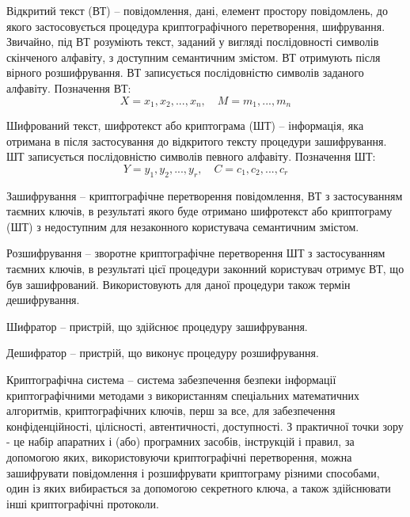 \begin{definition}
    Відкритий текст (ВТ) – повідомлення, дані, елемент простору
    повідомлень, до якого застосовується процедура криптографічного
    перетворення, шифрування. Звичайно, під ВТ розуміють текст, заданий у
    вигляді послідовності символів скінченого алфавіту, з доступним
    семантичним змістом. ВТ отримують після вірного розшифрування. ВТ
    записується послідовністю символів заданого алфавіту. Позначення ВТ:
    $$X = x_1, x_2, ..., x_n, \quad M = m_1, ..., m_n$$
\end{definition}

\begin{definition}
    Шифрований текст, шифротекст або криптограма (ШТ) –
    інформація, яка отримана в після застосування до відкритого тексту
    процедури зашифрування. ШТ записується послідовністю символів певного
    алфавіту. Позначення ШТ:
    $$Y = y_1, y_2, ..., y_r, \quad C = c_1, c_2, ..., c_r$$
\end{definition}

\begin{definition}[Зашифрування]
    Зашифрування – криптографічне перетворення повідомлення, ВТ з
    застосуванням таємних ключів, в результаті якого буде отримано
    шифротекст або криптограму (ШТ) з недоступним для незаконного
    користувача семантичним змістом.
\end{definition}

\begin{definition}[Розшифрування]
    Розшифрування – зворотне криптографічне перетворення ШТ з
    застосуванням таємних ключів, в результаті цієї процедури законний
    користувач отримує ВТ, що був зашифрований. Використовують для даної
    процедури також термін дешифрування.
\end{definition}

\begin{definition}[Шифратор]
    Шифратор – пристрій, що здійснює процедуру зашифрування.
\end{definition}

\begin{definition}[Дешифратор]
    Дешифратор – пристрій, що виконує процедуру розшифрування.
\end{definition}

\begin{definition}
    Криптографічна система – система забезпечення безпеки інформації
    криптографічними методами з використанням спеціальних математичних
    алгоритмів, криптографічних ключів, перш за все, для забезпечення
    конфіденційності, цілісності, автентичності, доступності. З практичної точки
    зору - це набір апаратних і (або) програмних засобів, інструкцій і правил, за
    допомогою яких, використовуючи криптографічні перетворення, можна
    зашифрувати повідомлення і розшифрувати криптограму різними способами,
    один із яких вибирається за допомогою секретного ключа, а також
    здійснювати інші криптографічні протоколи.
\end{definition}

